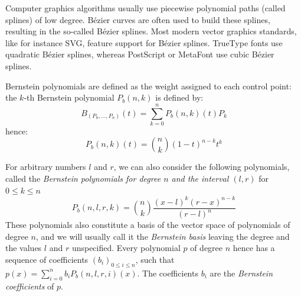 \documentclass{mscs}
\begin{document}
Computer graphics algorithms usually use piecewise polynomial paths
(called splines) of  low degree. B\'ezier curves are often used to
build these splines, resulting in the so-called B\'ezier splines. Most
modern vector graphics standards, like for instance SVG, feature
support for B\'ezier splines.
TrueType fonts use quadratic B\'ezier
splines, whereas PostScript or MetaFont \cite{metafont} use cubic
B\'ezier splines.


Bernstein polynomials are defined as the weight assigned to each
control point: the $k$-th Bernstein polynomial $P_b(n, k)$ is defined by:
$$B_{(P_0, \dots,P_n)}(t) = \sum_{k = 0}^n P_b(n, k)(t)P_k$$
hence:
$$P_b(n,  k)(t) = \binom{n}{k}(1 -t)^{n - k}t^k$$


For arbitrary numbers \(l\) and
\(r\), we can also consider the following polynomials, called
the {\em Bernstein polynomials for degree \(n\) and the interval
\((l,r)\)} for \(0 \leq k \leq n\)
\[P_b(n, l, r, k) = \binom{n}{k} \frac{(x-l)^{k}(r-x)^{n - k}}{(r-l)^n}\]
These polynomials also constitute a basis of the vector space of polynomials
of degree \(n\), and we will usually call it the {\em Bernstein basis} leaving
the degree and the values \(l\) and \(r\) unspecified.
Every polynomial \(p\) of degree \(n\) hence has a sequence of coefficients
\((b_i)_{0\leq i \leq n}\), such that \(p(x) = \sum_{i=0}^n b_i P_b(n,l,r,i)(x)\).  The coefficients
\(b_i\) are the {\em Bernstein coefficients} of $p$.
\end{document}
